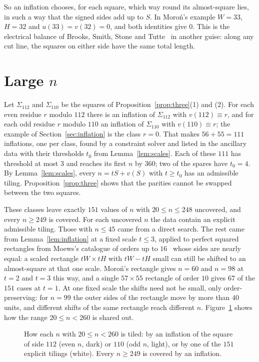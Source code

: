 \documentclass[11pt]{amsart}
\theoremstyle{definition}
\begin{document}
So an inflation chooses, for each square, which way round its almost-square lies, in such a way that
the signed sides add up to $S$. In Moro\'n's example $W=33$, $H=32$ and $u(33)=v(32)=0$, and both
identities give $0$. This is the electrical balance of Brooks, Smith, Stone and Tutte~\cite{bsst} in
another guise: along any cut line, the squares on either side have the same total length.

\section{Large \texorpdfstring{$n$}{n}}\label{sec:proof}

Let $\Sigma_{112}$ and $\Sigma_{110}$ be the squares of Proposition~\ref{prop:three}(1) and (2). For
each even residue $r$ modulo $112$ there is an inflation of $\Sigma_{112}$ with $v(112)\equiv r$, and for
each odd residue $r$ modulo $110$ an inflation of $\Sigma_{110}$ with $v(110)\equiv r$; the example of
Section~\ref{sec:inflation} is the class $r=0$. That makes $56+55=111$ inflations, one per class, found
by a constraint solver and listed in the ancillary data with their thresholds $t_0$ from
Lemma~\ref{lem:scales}. Each of these $111$ has threshold at most $3$ and reaches its first $n$ by
$360$; two of the spares have $t_0=4$. By Lemma~\ref{lem:scales}, every $n=tS+v(S)$ with $t\ge t_0$ has an admissible tiling.
Proposition~\ref{prop:three} shows that the parities cannot be swapped between the two squares.

These classes leave exactly $151$ values of $n$ with $20\le n\le248$ uncovered, and every $n\ge249$ is
covered. For each uncovered $n$ the data contain an explicit admissible tiling. Those with $n\le45$
came from a direct search. The rest came from Lemma~\ref{lem:inflation} at a fixed scale $t\le3$,
applied to perfect squared rectangles from Moews's catalogue of orders up to $16$~\cite{moews} whose
sides are nearly equal: a scaled rectangle $tW\times tH$ with $tW-tH$ small can still be shifted to an
almost-square at that one scale. Moro\'n's rectangle gives $n=60$ and $n=98$ at $t=2$ and $t=3$ this way,
and a single $57\times55$ rectangle of order $10$ gives $67$ of the $151$ cases at $t=1$. At one fixed
scale the shifts need not be small, only order-preserving: for $n=99$ the outer sides of the rectangle
move by more than $40$ units, and different shifts of the same rectangle reach different $n$.
Figure~\ref{fig:cover} shows how the range $20\le n<260$ is shared out.

\begin{figure}[ht]
\centering

\caption{How each $n$ with $20\le n<260$ is tiled: by an inflation of the square of side $112$ (even
$n$, dark) or $110$ (odd $n$, light), or by one of the $151$ explicit tilings (white). Every $n\ge249$
is covered by an inflation.}
\label{fig:cover}
\end{figure}
\end{document}
